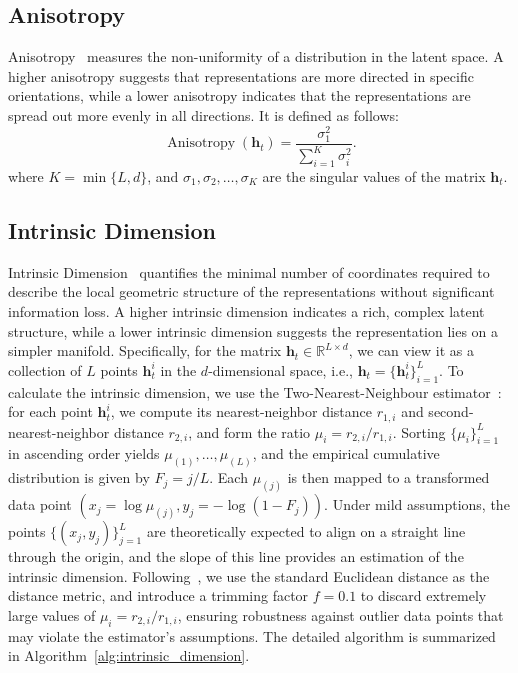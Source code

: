 \documentclass{article} %
\begin{document}
\subsection{Anisotropy}
Anisotropy~\citep{razzhigaev2024shape} measures the non-uniformity of a distribution in the latent space. A higher anisotropy
suggests that representations are more directed
in specific orientations, while a lower anisotropy indicates that the representations are spread out more evenly in all directions. It is defined as follows:
\begin{equation}
    \operatorname{Anisotropy}(\mathbf{h}_t) = \frac{\sigma_1^2}{\sum_{i=1}^{K} \sigma_i^2}.
\end{equation}
where $K = \min \{ L, d \}$, and $\sigma_1,\sigma_2, \dots,  \sigma_{K}$ are the singular values of the matrix $\mathbf{h}_t$.
\subsection{Intrinsic Dimension}
Intrinsic Dimension~\citep{facco2017estimating,cheng2025emergence} quantifies the minimal number of coordinates required to describe the local geometric structure of the representations without significant information loss. 
%
A higher intrinsic dimension indicates a rich, complex latent structure, while a lower intrinsic dimension suggests the representation lies on a simpler manifold.
%
Specifically, for the matrix $\mathbf{h}_{t}\in\mathbb{R}^{L{\times}d}$, we can view it as a collection of $L$ points $\mathbf{h}^{i}_{t}$ in the $d$-dimensional space, i.e., $\mathbf{h}_t
= \{\mathbf{h}^{i}_{t}\}_{i=1}^L$. To calculate the intrinsic dimension, we use the Two-Nearest-Neighbour estimator~\citep{facco2017estimating}: 
%
for each point $\mathbf{h}^i_t$, we compute its nearest-neighbor distance $r_{1,i}$ and second-nearest-neighbor distance $r_{2,i}$, and form the ratio
$\mu_i = r_{2,i}/r_{1,i}$. Sorting $\{\mu_i\}_{i=1}^L$ in ascending order yields $\mu_{(1)},\dots,\mu_{(L)}$, and the empirical cumulative distribution is given by $F_j = j/L$. Each $\mu_{(j)}$ is then mapped to a transformed data point
$
(x_j = \log \mu_{(j)}, y_j = -\log(1 - F_j))$. Under mild assumptions, the points $\{(x_j, y_j)\}^{L}_{j=1}$ are theoretically expected to align on a straight line through the origin, and the slope of this line provides an estimation of the intrinsic dimension. 
%
Following~\citet{dadapy}, we use the standard Euclidean distance as the distance metric, and introduce a trimming factor $f=0.1$ to discard extremely large values of $\mu_i = r_{2,i} / r_{1,i}$, ensuring robustness against outlier data points that may violate the estimator’s assumptions.
%
The detailed algorithm is summarized in Algorithm~\ref{alg:intrinsic_dimension}.

\end{document}
